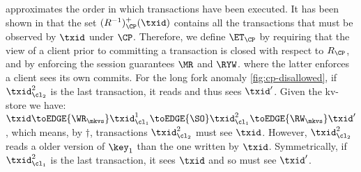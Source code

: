 approximates the order in which transactions have been executed. It has been shown in \cite{laws} 
that the set $(R^{-1})^{+}_{\CP}(\txid)$ contains all the transactions that {must} be observed by $\txid$ under 
$\CP$. Therefore, we define $\ET_{\CP}$ by requiring that the view of a client prior to committing a transaction is 
closed with respect to $R_{\CP}$, and by enforcing the session guarantees $\MR$ and $\RYW$.
where the latter enforces a client sees its own commits.
For the long fork anomaly \cref{fig:cp-disallowed},
if \( \txid_{\cl_2}^2\) is the last transaction, it reads and thus sees \( \txid' \).
Given the kv-store we have:
\(
\txid \toEDGE{\WR_\mkvs} \txid^1_{\cl_1} \toEDGE{\SO} \txid^2_{\cl_1} \toEDGE{\RW_\mkvs} \txid'
\),
which means, by \( \dagger \), transactions \( \txid_{\cl_2}^2 \) must see \( \txid \).
However, \(  \txid_{\cl_2}^2 \) reads a older version of \( \key_1 \) than the one written by \( \txid \).
Symmetrically,
if \( \txid_{\cl_1}^2\) is the last transaction, it sees \( \txid \) and so must see \( \txid' \).


